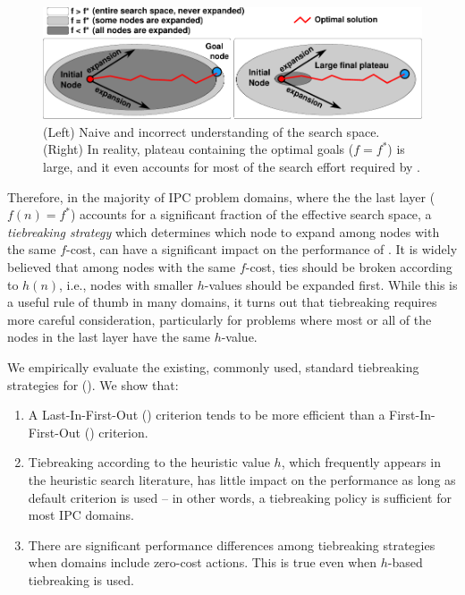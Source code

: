 \begin{figure}[htbp]
  \centering
  \includegraphics{img/astar/plateau-0.pdf}
 \caption{(Left) Naive and incorrect understanding of the search space. (Right) In reality, plateau containing the optimal goals ($f=f^*$) is large, and it even accounts for most of the search effort required by \astar.
  }
 \label{fig:plateau-0}
\end{figure}

Therefore, in the majority of IPC problem domains, where the 
the last layer ($f(n)=f^*$) accounts for a significant fraction of the effective search space, a
\emph{tiebreaking strategy} which determines which node to 
 expand among nodes with the same $f$-cost,
can have a significant impact on the
performance of \astar. 
It is widely believed that among nodes with the same $f$-cost,
ties should be broken according to $h(n)$, i.e.,
nodes with smaller $h$-values should be expanded first.  While this is a
useful rule of thumb in many domains, it turns out that tiebreaking
requires more careful consideration, particularly for problems where
most or all of the nodes in the last layer have the same $h$-value.

We empirically evaluate the existing, commonly used, standard
tiebreaking strategies for \astar ().
We show that:

\begin{enumerate}
 \item A Last-In-First-Out (\lifo) criterion tends to be more efficient
       than a First-In-First-Out (\fifo) criterion.
 \item Tiebreaking according to the heuristic value $h$, which
       frequently appears in the heuristic search literature, has little
       impact on the performance as long as \lifo default criterion is used 
       --  in other words, a \lifo tiebreaking policy is sufficient for most IPC domains.
 \item There are significant performance differences among tiebreaking strategies
       when domains include zero-cost actions. This is true even when $h$-based tiebreaking is used.
\end{enumerate}

